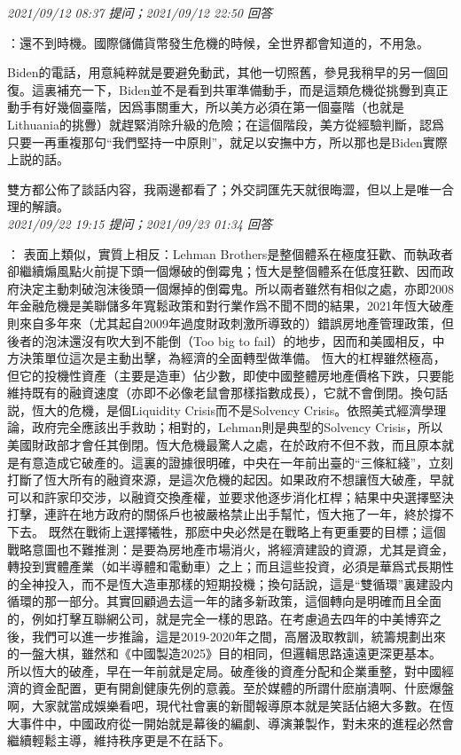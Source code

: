 \documentclass[twocolumn]{ctexart}
\begin{document}
\textit{\hfill\noindent\small 2021/09/12 08:37 提问；2021/09/12 22:50 回答}

：還不到時機。國際儲備貨幣發生危機的時候，全世界都會知道的，不用急。

Biden的電話，用意純粹就是要避免動武，其他一切照舊，參見我稍早的另一個回復。這裏補充一下，Biden並不是看到共軍準備動手，而是這類危機從挑釁到真正動手有好幾個臺階，因爲事關重大，所以美方必須在第一個臺階（也就是Lithuania的挑釁）就趕緊消除升級的危險；在這個階段，美方從經驗判斷，認爲只要一再重複那句“我們堅持一中原則”，就足以安撫中方，所以那也是Biden實際上説的話。

雙方都公佈了談話内容，我兩邊都看了；外交詞匯先天就很晦澀，但以上是唯一合理的解讀。
\\

\textit{\hfill\noindent\small 2021/09/22 19:15 提问；2021/09/23 01:34 回答}

：
表面上類似，實質上相反：Lehman Brothers是整個體系在極度狂歡、而執政者卻繼續煽風點火前提下頭一個爆破的倒霉鬼；恆大是整個體系在低度狂歡、因而政府決定主動刺破泡沫後頭一個爆掉的倒霉鬼。所以兩者雖然有相似之處，亦即2008年金融危機是美聯儲多年寬鬆政策和對行業作爲不聞不問的結果，2021年恆大破產則來自多年來（尤其起自2009年過度財政刺激所導致的）錯誤房地產管理政策，但後者的泡沫還沒有吹大到不能倒（Too big to fail）的地步，因而和美國相反，中方決策單位這次是主動出擊，為經濟的全面轉型做準備。
恆大的杠桿雖然極高，但它的投機性資產（主要是造車）佔少數，即使中國整體房地產價格下跌，只要能維持既有的融資速度（亦即不必像老鼠會那樣指數成長），它就不會倒閉。換句話説，恆大的危機，是個Liquidity Crisis而不是Solvency Crisis。依照美式經濟學理論，政府完全應該出手救助；相對的，Lehman則是典型的Solvency Crisis，所以美國財政部才會任其倒閉。恆大危機最驚人之處，在於政府不但不救，而且原本就是有意造成它破產的。這裏的證據很明確，中央在一年前出臺的“三條紅綫”，立刻打斷了恆大所有的融資來源，是這次危機的起因。如果政府不想讓恆大破產，早就可以和許家印交涉，以融資交換產權，並要求他逐步消化杠桿；結果中央選擇堅決打擊，連許在地方政府的關係戶也被嚴格禁止出手幫忙，恆大拖了一年，終於撐不下去。
既然在戰術上選擇犧牲，那麽中央必然是在戰略上有更重要的目標；這個戰略意圖也不難推測：是要為房地產市場消火，將經濟建設的資源，尤其是資金，轉投到實體產業（如半導體和電動車）之上；而且這些投資，必須是華爲式長期性的全神投入，而不是恆大造車那樣的短期投機；換句話說，這是“雙循環”裏建設内循環的那一部分。其實回顧過去這一年的諸多新政策，這個轉向是明確而且全面的，例如打擊互聯網公司，就是完全一樣的思路。在考慮過去四年的中美博弈之後，我們可以進一步推論，這是2019-2020年之間，高層汲取教訓，統籌規劃出來的一盤大棋，雖然和《中國製造2025》目的相同，但邏輯思路遠遠更深更基本。
所以恆大的破產，早在一年前就是定局。破產後的資產分配和企業重整，對中國經濟的資金配置，更有開創健康先例的意義。至於媒體的所謂什麽崩潰啊、什麽爆盤啊，大家就當成娛樂看吧，現代社會裏的新聞報導原本就是笑話佔絕大多數。在恆大事件中，中國政府從一開始就是幕後的編劇、導演兼製作，對未來的進程必然會繼續輕鬆主導，維持秩序更是不在話下。
\\
\end{document}
